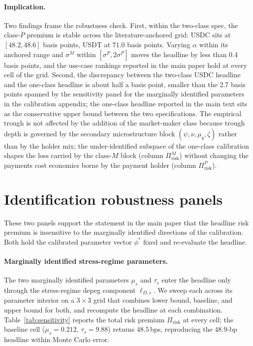 \paragraph{Implication.} Two findings frame the robustness check. First, within the two-class spec, the class-$P$ premium is stable across the literature-anchored grid: USDC sits at $[48.2, 48.6]$ basis points, USDT at $71.0$ basis points. Varying $\alpha$ within its anchored range and $\sigma^M$ within $[\sigma^P, 2 \sigma^P]$ moves the headline by less than 0.4 basis points, and the use-case rankings reported in the main paper hold at every cell of the grid. Second, the discrepancy between the two-class USDC headline and the one-class headline is about half a basis point, smaller than the 2.7 basis points spanned by the sensitivity panel for the marginally identified parameters in the calibration appendix; the one-class headline reported in the main text sits as the conservative upper bound between the two specifications. The empirical trough is not affected by the addition of the market-maker class because trough depth is governed by the secondary microstructure block $(\psi, \nu, \mu_q, \zeta)$ rather than by the holder mix; the under-identified subspace of the one-class calibration shapes the loss carried by the class-$M$ block (column $\Pi_{\text{risk}}^M$) without changing the payments cost economics borne by the payment holder (column $\Pi_{\text{risk}}^P$).

\section{Identification robustness panels}\label{ia:robustness_panels}

These two panels support the statement in the main paper that the headline risk premium is insensitive to the marginally identified directions of the calibration. Both hold the calibrated parameter vector $\phi^*$ fixed and re-evaluate the headline.

\paragraph{Marginally identified stress-regime parameters.} The two marginally identified parameters $\mu_s$ and $\tau_s$ enter the headline only through the stress-regime depeg component $\ell_{D,s}$. We sweep each across its parameter interior on a $3 \times 3$ grid that combines lower bound, baseline, and upper bound for both, and recompute the headline at each combination. Table~\ref{tab:sensitivity} reports the total risk premium $\Pi_{\text{risk}}$ at every cell; the baseline cell ($\mu_s=0.212$, $\tau_s=9.88$) returns $48.5$\,bps, reproducing the $48.9$-bp headline within Monte Carlo error.

